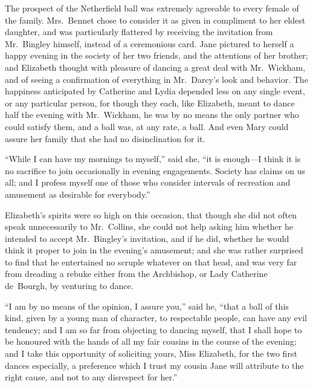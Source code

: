 The prospect of the Netherfield ball was extremely agreeable to
every female of the family.  Mrs.\ Bennet chose to consider it as
given in compliment to her eldest daughter, and was particularly
flattered by receiving the invitation from Mr.\ Bingley himself,
instead of a ceremonious card.  Jane pictured to herself a happy
evening in the society of her two friends, and the attentions of
her brother; and Elizabeth thought with pleasure of dancing a
great deal with Mr.\ Wickham, and of seeing a confirmation of
everything in Mr.\ Darcy's look and behavior.  The happiness
anticipated by Catherine and Lydia depended less on any single
event, or any particular person, for though they each, like
Elizabeth, meant to dance half the evening with Mr.\ Wickham,
he was by no means the only partner who could satisfy them, and
a ball was, at any rate, a ball.  And even Mary could assure her
family that she had no disinclination for it.

``While I can have my mornings to myself,'' said she, ``it is
enough---I think it is no sacrifice to join occasionally in evening
engagements.  Society has claims on us all; and I profess myself
one of those who consider intervals of recreation and amusement
as desirable for everybody.''

Elizabeth's spirits were so high on this occasion, that though she
did not often speak unnecessarily to Mr.\ Collins, she could not
help asking him whether he intended to accept Mr.\ Bingley's
invitation, and if he did, whether he would think it proper to join
in the evening's amusement; and she was rather surprised to find
that he entertained no scruple whatever on that head, and was
very far from dreading a rebuke either from the Archbishop, or
Lady Catherine de~Bourgh, by venturing to dance.

``I am by no means of the opinion, I assure you,'' said he, ``that
a ball of this kind, given by a young man of character, to
respectable people, can have any evil tendency; and I am so
far from objecting to dancing myself, that I shall hope to be
honoured with the hands of all my fair cousins in the course of
the evening; and I take this opportunity of soliciting yours, Miss
Elizabeth, for the two first dances especially, a preference which
I trust my cousin Jane will attribute to the right cause, and not
to any disrespect for her.''


